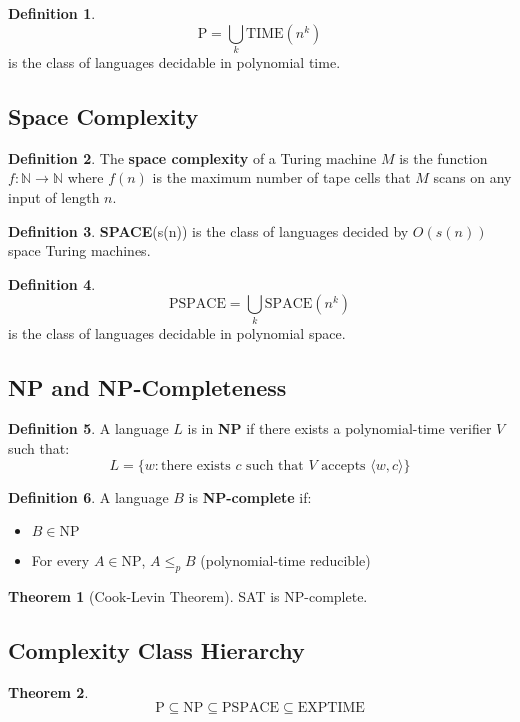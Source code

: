 \documentclass[11pt]{article}
\theoremstyle{definition}
\newtheorem{definition}{Definition}[section]
\newtheorem{theorem}{Theorem}[section]
\begin{document}
\begin{definition}
$$\text{P} = \bigcup_{k} \text{TIME}(n^k)$$
is the class of languages decidable in polynomial time.
\end{definition}

\subsection{Space Complexity}
\begin{definition}
The \textbf{space complexity} of a Turing machine $M$ is the function $f: \mathbb{N} \to \mathbb{N}$ where $f(n)$ is the maximum number of tape cells that $M$ scans on any input of length $n$.
\end{definition}

\begin{definition}
\textbf{SPACE}(s(n)) is the class of languages decided by $O(s(n))$ space Turing machines.
\end{definition}

\begin{definition}
$$\text{PSPACE} = \bigcup_{k} \text{SPACE}(n^k)$$
is the class of languages decidable in polynomial space.
\end{definition}

\subsection{NP and NP-Completeness}
\begin{definition}
A language $L$ is in \textbf{NP} if there exists a polynomial-time verifier $V$ such that:
$$L = \{w : \text{there exists } c \text{ such that } V \text{ accepts } \langle w, c \rangle\}$$
\end{definition}

\begin{definition}
A language $B$ is \textbf{NP-complete} if:
\begin{itemize}
    \item $B \in \text{NP}$
    \item For every $A \in \text{NP}$, $A \leq_p B$ (polynomial-time reducible)
\end{itemize}
\end{definition}

\begin{theorem}[Cook-Levin Theorem]
SAT is NP-complete.
\end{theorem}

\subsection{Complexity Class Hierarchy}
\begin{theorem}
$$\text{P} \subseteq \text{NP} \subseteq \text{PSPACE} \subseteq \text{EXPTIME}$$
\end{theorem}
\end{document}

